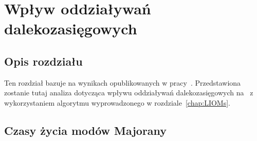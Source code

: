 \chapter{Wpływ  oddziaływań dalekozasięgowych}
\label{chap:longrange}

\section*{Opis rozdziału}

Ten rozdział bazuje na wynikach opublikowanych w pracy~\cite{wieckowski.ptok.2019}.
Przedstawiona zostanie tutaj analiza dotycząca wpływu oddziaływań dalekozasięgowych na \MZM\ z wykorzystaniem algorytmu wyprowadzonego w rozdziale~\ref{chap:LIOMs}.

\section{Czasy życia modów Majorany}

